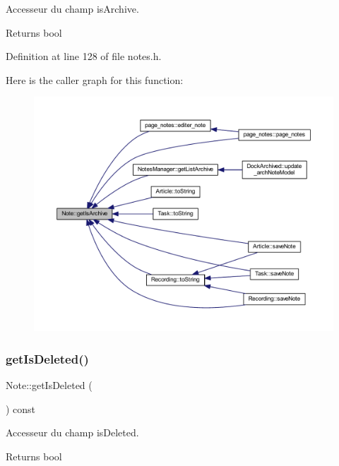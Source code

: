 Accesseur du champ is\+Archive. 

\begin{DoxyReturn}{Returns}
bool 
\end{DoxyReturn}


Definition at line 128 of file notes.\+h.

Here is the caller graph for this function\+:\nopagebreak
\begin{figure}[H]
\begin{center}
\leavevmode
\includegraphics[width=350pt]{class_note_a3ff22c94b72b8c5cb93638bd16262d0d_icgraph}
\end{center}
\end{figure}
\mbox{\label{class_note_af56c546c7e0e471b2dd5b201d4835e37}} 
\subsubsection{\texorpdfstring{get\+Is\+Deleted()}{getIsDeleted()}}
{\footnotesize\ttfamily Note\+::get\+Is\+Deleted (\begin{DoxyParamCaption}{ }\end{DoxyParamCaption}) const\hspace{0.3cm}{\ttfamily [inline]}}



Accesseur du champ is\+Deleted. 

\begin{DoxyReturn}{Returns}
bool 
\end{DoxyReturn}


